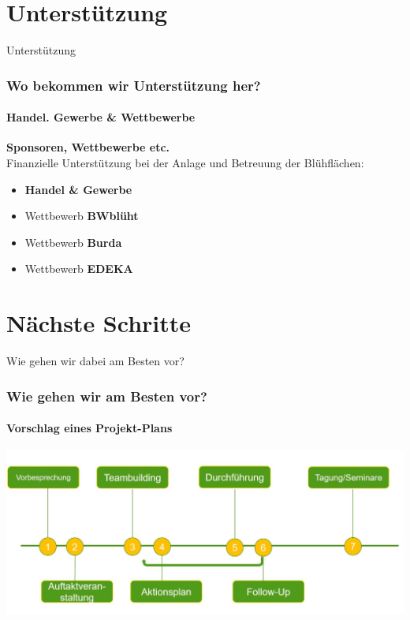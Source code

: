 \documentclass[aspectratio=169]{beamer}
\begin{document}
\section[Jahr]{Unterstützung}

\begin{frame}{Unterstützung}
\frametitle{Wo bekommen wir Unterstützung her?} 
\framesubtitle{Handel. Gewerbe \& Wettbewerbe}

\textbf{Sponsoren, Wettbewerbe etc.}\\
Finanzielle Unterstützung bei der Anlage und Betreuung der Blühflächen:

\begin{itemize}
	\item 
	\textbf{Handel \& Gewerbe} \pause 
	\item
	Wettbewerb \textbf{BWblüht} \pause
	\item 
	Wettbewerb \textbf{Burda} \pause
	\item 
	Wettbewerb \textbf{EDEKA}%

\end{itemize}
\end{frame}




\section{Nächste Schritte}

\begin{frame}{Wie gehen wir dabei am Besten vor?}
\frametitle{Wie gehen wir am Besten vor?} 
\framesubtitle{Vorschlag eines Projekt-Plans}

\begin{center}
	
	\includegraphics[width=1.0\textwidth]{figures/Ablaufschema.JPG}
	
\end{center}

\end{frame}
\end{document}
